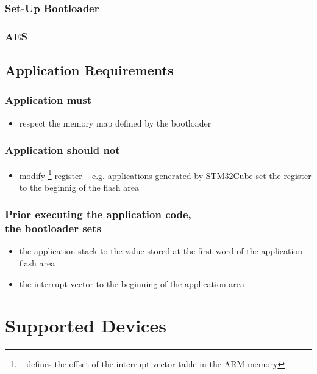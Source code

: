 \subsubsection*{Set-Up Bootloader}

\subsubsection*{AES}


\clearpage
\subsection{Application Requirements}
\subsubsection*{Application must}
\begin{itemize}
  \item respect the memory map defined by the bootloader
\end{itemize}

\subsubsection*{Application should not}
\begin{itemize}
  \item modify \footnote{ -- defines the offset of the interrupt vector table in the ARM memory} register -- e.g. applications generated by STM32Cube set the  register to the beginnig of the flash area
\end{itemize}

\subsubsection*{Prior executing the application code,\\the bootloader sets}
\begin{itemize}
  \item the application stack to the value stored at the first word of the application flash area
  \item the interrupt vector to the beginning of the application area
\end{itemize}

\clearpage
\section{Supported Devices}\label{sec:supportedDevices}

